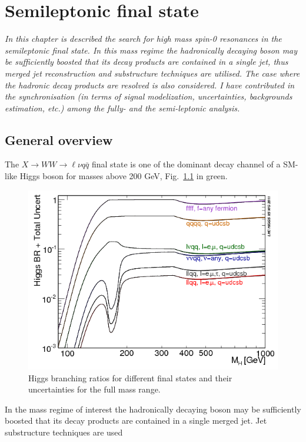 \chapter{Semileptonic final state}
\label{cap6}

\textit{In this chapter is described   the search for high mass spin-0 resonances in the semileptonic final state. In this mass regime the hadronically decaying boson may be sufficiently boosted that its decay products are contained in a single jet, thus merged jet
reconstruction and substructure techniques are utilised. The case where the hadronic
decay products are resolved is also considered. I have contributed in the synchronisation (in terms of signal modelization, uncertainties, 
backgrounds estimation, etc.) among the fully- and the semi-leptonic analysis. }

\section{General overview}
The $X \to WW \to \ell \nu q \bar{q}$ final state is one of the dominant decay channel of a SM-like Higgs boson for masses above 200 GeV,  Fig.~\ref{BRTotalUncertBands4f2} in green.
\begin{figure}
\centering
\includegraphics[scale= 0.65]{../Cap5/BRTotalUncertBands4f2}
\caption{Higgs branching ratios for different final states and their uncertainties for the full mass range.}
\label{BRTotalUncertBands4f2}
\end{figure}
In the mass regime of interest the hadronically decaying boson may be sufficiently boosted that
its decay products are contained in a single merged jet. Jet substructure techniques are used
